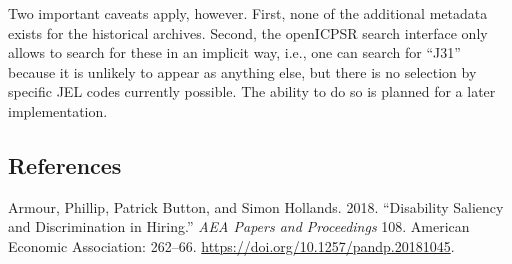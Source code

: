 \documentclass[]{article}
\begin{document}
Two important caveats apply, however. First, none of the additional
metadata exists for the historical archives. Second, the openICPSR
search interface only allows to search for these in an implicit way,
i.e., one can search for ``J31'' because it is unlikely to appear as
anything else, but there is no selection by specific JEL codes currently
possible. The ability to do so is planned for a later implementation.

\hypertarget{references}{%
\subsection*{References}\label{references}}

\hypertarget{refs}{}
\leavevmode\hypertarget{ref-Armour_2018}{}%
Armour, Phillip, Patrick Button, and Simon Hollands. 2018. ``Disability
Saliency and Discrimination in Hiring.'' \emph{AEA Papers and
Proceedings} 108. American Economic Association: 262--66.
\url{https://doi.org/10.1257/pandp.20181045}.
\end{document}
